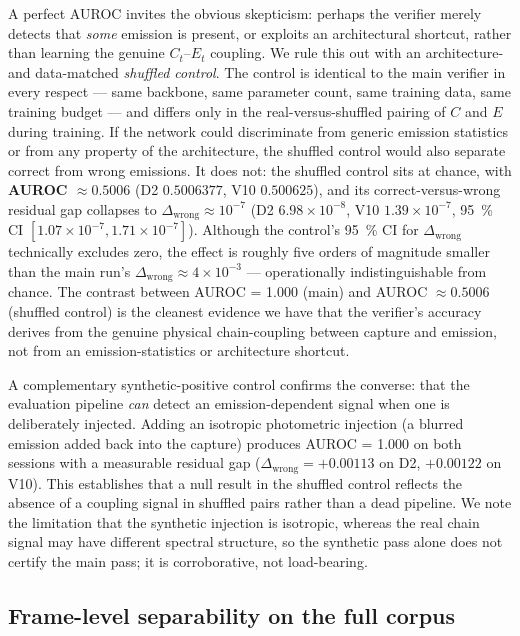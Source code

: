 A perfect AUROC invites the obvious skepticism: perhaps the verifier merely
detects that \emph{some} emission is present, or exploits an architectural
shortcut, rather than learning the genuine $C_t$--$E_t$ coupling. We rule this
out with an architecture- and data-matched \emph{shuffled control}. The control
is identical to the main verifier in every respect --- same backbone, same
parameter count, same training data, same training budget --- and differs only
in the real-versus-shuffled pairing of $C$ and $E$ during training. If the
network could discriminate from generic emission statistics or from any property
of the architecture, the shuffled control would also separate correct from wrong
emissions. It does not: the shuffled control sits at chance, with
\textbf{AUROC $\approx 0.5006$} (D2 $0.5006377$, V10 $0.500625$), and its
correct-versus-wrong residual gap collapses to
$\Delta_{\text{wrong}} \approx 10^{-7}$ (D2 $6.98\times10^{-8}$, V10
$1.39\times10^{-7}$, \SI{95}{\percent} CI $[1.07\times10^{-7}, 1.71\times10^{-7}]$).
Although the control's \SI{95}{\percent} CI for $\Delta_{\text{wrong}}$ technically
excludes zero, the effect is roughly five orders of magnitude smaller than the
main run's $\Delta_{\text{wrong}} \approx 4\times10^{-3}$ --- operationally
indistinguishable from chance. The contrast between AUROC = 1.000 (main) and
AUROC $\approx 0.5006$ (shuffled control) is the cleanest evidence we have that
the verifier's accuracy derives from the genuine physical chain-coupling between
capture and emission, not from an emission-statistics or architecture shortcut.

A complementary synthetic-positive control confirms the converse: that the
evaluation pipeline \emph{can} detect an emission-dependent signal when one is
deliberately injected. Adding an isotropic photometric injection (a blurred
emission added back into the capture) produces AUROC = 1.000 on both sessions
with a measurable residual gap ($\Delta_{\text{wrong}} = +0.00113$ on D2,
$+0.00122$ on V10). This establishes that a null result in the shuffled control
reflects the absence of a coupling signal in shuffled pairs rather than a dead
pipeline. We note the limitation that the synthetic injection is isotropic,
whereas the real chain signal may have different spectral structure, so the
synthetic pass alone does not certify the main pass; it is corroborative, not
load-bearing.

\subsection{Frame-level separability on the full corpus}
\label{sec:results_main_framelevel}

